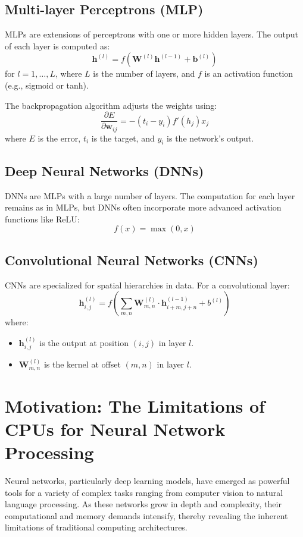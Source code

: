 \subsection{Multi-layer Perceptrons (MLP)}

MLPs are extensions of perceptrons with one or more hidden layers. The output of each layer is computed as:
\[ \mathbf{h}^{(l)} = f(\mathbf{W}^{(l)} \mathbf{h}^{(l-1)} + \mathbf{b}^{(l)}) \]
for \( l = 1, \ldots, L \), where \( L \) is the number of layers, and \( f \) is an activation function (e.g., sigmoid or tanh).

The backpropagation algorithm adjusts the weights using:
\[ \frac{\partial E}{\partial \mathbf{w}_{ij}} = -(t_i - y_i) f'(h_j) x_j \]
where \( E \) is the error, \( t_i \) is the target, and \( y_i \) is the network's output.

\subsection{Deep Neural Networks (DNNs)}

DNNs are MLPs with a large number of layers. The computation for each layer remains as in MLPs, but DNNs often incorporate more advanced activation functions like ReLU:
\[ f(x) = \max(0, x) \]

\subsection{Convolutional Neural Networks (CNNs)}

CNNs are specialized for spatial hierarchies in data. For a convolutional layer:
\[ \mathbf{h}_{i,j}^{(l)} = f\left( \sum_{m,n} \mathbf{W}^{(l)}_{m,n} \cdot \mathbf{h}_{i+m,j+n}^{(l-1)} + b^{(l)} \right) \]
where:
\begin{itemize}
	\item \( \mathbf{h}_{i,j}^{(l)} \) is the output at position \( (i,j) \) in layer \( l \).
	\item \( \mathbf{W}^{(l)}_{m,n} \) is the kernel at offset \( (m,n) \) in layer \( l \).
\end{itemize}



\section{Motivation: The Limitations of CPUs for Neural Network Processing}

Neural networks, particularly deep learning models, have emerged as powerful tools for a variety of complex tasks ranging from computer vision to natural language processing. As these networks grow in depth and complexity, their computational and memory demands intensify, thereby revealing the inherent limitations of traditional computing architectures.

